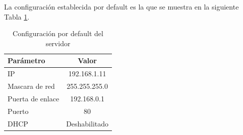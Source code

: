 La configuración establecida por default es la que se muestra en la siguiente Tabla \ref{tab:servercfg}.

\begin{table}[!h]
  \centering
  \begin{tabular}{l c}
    \hline 
    Parámetro    & Valor \\
    \hline \hline
    IP               & 192.168.1.11 \\
    Mascara de red   & 255.255.255.0 \\
    Puerta de enlace & 192.168.0.1 \\
    Puerto           & 80 \\
    DHCP             & Deshabilitado \\
    \hline
  \end{tabular}
  \caption{Configuración por default del servidor}
  \label{tab:servercfg}
\end{table}


%
%	
%
%
%
%
%
%
%	
%		
%
%		
%		
%		
%		
%


